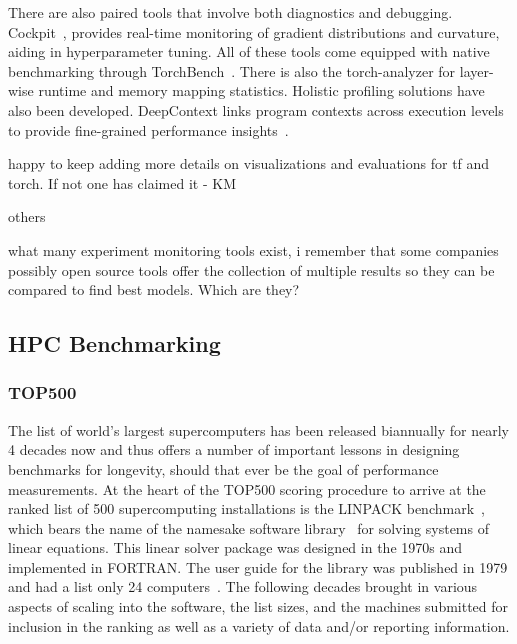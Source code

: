 There are also paired tools that involve both diagnostics and debugging. Cockpit~\cite{DBLP:journals/corr/abs-2102-06604}, provides real-time monitoring of gradient distributions and curvature, aiding in hyperparameter tuning.
All of these tools come equipped with native benchmarking through TorchBench~\cite{zhao2024deepcontextcontextawarecrossplatformcrossframework}. 
There is also the torch-analyzer for layer-wise runtime and memory mapping statistics.
Holistic profiling solutions have also been developed.
DeepContext links program contexts across execution levels to provide fine-grained performance insights~\cite{zhao2024deepcontextcontextawarecrossplatformcrossframework}.

{happy to keep adding more details on visualizations and evaluations for tf and torch. If not one has claimed it - KM}

others

what many experiment monitoring tools exist, i remember that some companies possibly open source tools offer the collection of multiple results so they can be compared to find best models. Which are they?
    
\subsection{HPC Benchmarking}
\label{subsec:benchmarks-hpc}


\subsubsection{TOP500}
\label{subsec:benchmarks-hpc-top500}

The list of world's largest supercomputers has been released biannually
for nearly 4 decades now and thus offers a number of important lessons
in designing benchmarks for longevity, should that ever be the goal of
performance measurements. At the heart of the TOP500 scoring procedure to
arrive at the ranked list of 500 supercomputing installations is the
LINPACK benchmark~\cite{dongarra2003hpl}, which bears the name of the
namesake software library~\cite{dongarra1979linpack} for
solving systems of linear equations. This linear solver package was
designed in the 1970s and implemented in FORTRAN. The user guide for the
library was published in 1979 and had a list only 24
computers~\cite{dongarra1979linpack}. The
following decades brought in various aspects of scaling into the
software, the list sizes, and the machines submitted for inclusion in the
ranking as well as a variety of data and/or reporting information.

